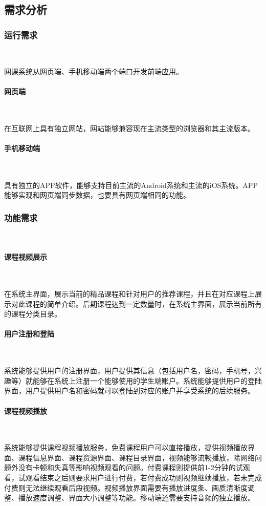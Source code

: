 \subsection{需求分析}
\subsubsection{运行需求}\

网课系统从网页端、手机移动端两个端口开发前端应用。

\paragraph{网页端}\

在互联网上具有独立网站，网站能够兼容现在主流类型的浏览器和其主流版本。

\paragraph{手机移动端}\

具有独立的APP软件，能够支持目前主流的Android系统和主流的iOS系统。APP能够实现和网页端同步数据，也要具有网页端相同的功能。

\subsubsection{功能需求}\

\paragraph{课程视频展示}\

在系统主界面，展示当前的精品课程和针对用户的推荐课程，并且在对应课程上展示对此课程的简单介绍。后期课程达到一定数量时，在系统主界面，展示当前所有的课程分类目录。

\paragraph{用户注册和登陆}\

系统能够提供用户的注册界面，用户提供其信息（包括用户名，密码，手机号，兴趣等）就能够在系统上注册一个能够使用的学生端账户。系统能够提供用户的登陆界面，用户提供用户名和密码就可以登陆到对应的账户并享受系统的后续服务。

\paragraph{课程视频播放}\

系统能够提供课程视频播放服务，免费课程用户可以直接播放，提供视频播放界面、课程信息界面、课程资源界面、课程目录界面，视频能够流畅播放，除网络问题外没有卡顿和失真等影响视频观看的问题。付费课程则提供前1-2分钟的试观看，试观看结束之后则要求用户进行付费，若付费成功则视频继续播放，若未完成付费则无法继续观看后段视频。视频播放界面需要有播放进度条、画质清晰度调整、播放速度调整、界面大小调整等功能。移动端还需要支持音频的独立播放。

